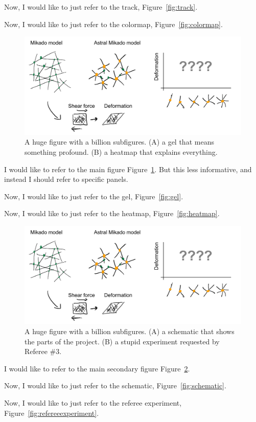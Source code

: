 \documentclass[onecolumn,11pt]{article}
\begin{document}
Now, I would like to just refer to the track, Figure~\ref{fig:track}.

Now, I would like to just refer to the colormap, Figure~\ref{fig:colormap}.



\clearpage




\begin{figure}[ht]
        \centering
        \includegraphics[width=4.5in]{figures/figJeanJacket.pdf}


        \caption{A huge figure with a billion subfigures. 
        (A) a gel that means something profound. 
        (B) a heatmap that explains everything.}
        \label{fig:main_conclusion}
\end{figure}
    

I would like to refer to the main figure Figure~\ref{fig:main_conclusion}. But this less informative, and instead I should refer to specific panels.

Now, I would like to just refer to the gel, Figure~\ref{fig:gel}.

Now, I would like to just refer to the heatmap, Figure~\ref{fig:heatmap}.




\newpage
\begin{figure}[ht]
        \centering
        \includegraphics[width=4.5in]{figures/figJeanJacket.pdf}
        \caption{A huge figure with a billion subfigures. 
        (A) a schematic that shows the parts of the project. 
        (B) a stupid experiment requested by Referee \#3.}
        \label{fig:secondaryconclusion}
\end{figure}

I would like to refer to the main secondary figure Figure~\ref{fig:secondaryconclusion}.

Now, I would like to just refer to the schematic, Figure~\ref{fig:schematic}.

Now, I would like to just refer to the referee experiment, Figure~\ref{fig:refereeexperiment}.
\end{document}
